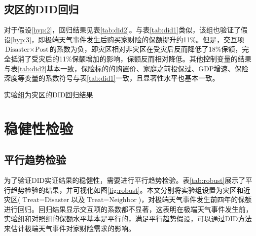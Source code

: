 \subsection{灾区的DID回归}
对于假设\ref{hyp:2}，回归结果见表\ref{tab:did2}。与表\ref{tab:did1}类似，该组也验证了假设\ref{hyp:3}，即极端天气事件发生后购买家财险的保额提升约11\%。但是，交互项$\text{Disaster}\times \text{Post}$的系数为负，即灾区相对非灾区在受灾后反而降低了18\%保额，完全抵消了受灾后的11\%保额增加的影响，保额反而相对降低。其他控制变量的结果与表\ref{tab:did2}基本一致，保险标的的购置价、家庭之前投保过、GDP增速、保险深度等变量的系数符号与表\ref{tab:did1}一致，且显著性水平也基本一致。

\begin{table}[H]
    \centering
    \caption{实验组为灾区的DID回归结果}\label{tab:did2}
    
\end{table}

\section{稳健性检验}
\subsection{平行趋势检验}

为了验证DID实证结果的稳健性，需要进行平行趋势检验。表\ref{tab:robust}展示了平行趋势检验的结果，并可视化如图\ref{fig:robust}。本文分别将实验组设置为灾区和近灾区($\text{Treat}=\text{Disaster}$以及$\text{Treat}=\text{Neighbor}$)，对极端天气事件发生前四年的保额进行回归。回归结果显示交互项的系数都不显著，这表明在极端天气事件发生前，实验组和对照组的保额水平基本是平行的，满足平行趋势假设，可以通过DID方法来估计极端天气事件对家财险需求的影响。

